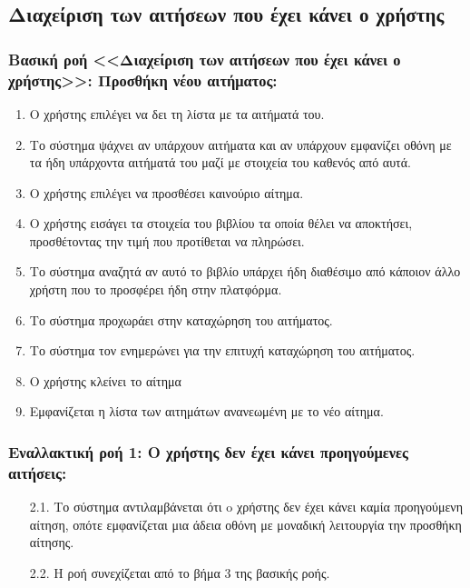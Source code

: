 \documentclass[12pt,a4paper]{article}
\begin{document}
\subsection{Διαχείριση των αιτήσεων που έχει κάνει ο χρήστης}

\subsubsection*{Βασική ροή <<Διαχείριση των αιτήσεων που έχει κάνει ο χρήστης>>: Προσθήκη νέου αιτήματος:}
\begin{enumerate}
    \item Ο χρήστης επιλέγει να δει τη λίστα με τα αιτήματά του. 
    \item Το σύστημα ψάχνει αν υπάρχουν αιτήματα και αν υπάρχουν εμφανίζει οθόνη με τα ήδη υπάρχοντα αιτήματά του μαζί με στοιχεία του καθενός από αυτά. 
    \item Ο χρήστης επιλέγει να προσθέσει καινούριο αίτημα.
    \item Ο χρήστης εισάγει τα στοιχεία του βιβλίου τα οποία θέλει να αποκτήσει, προσθέτοντας την τιμή που προτίθεται να πληρώσει. 
    \item Το σύστημα αναζητά αν αυτό το βιβλίο υπάρχει ήδη διαθέσιμο από κάποιον άλλο χρήστη που το προσφέρει ήδη στην πλατφόρμα. 
    \item Το σύστημα προχωράει στην καταχώρηση του αιτήματος. 
    \item Το σύστημα τον ενημερώνει για την επιτυχή καταχώρηση του αιτήματος. 
    \item Ο χρήστης κλείνει το αίτημα
    \item Εμφανίζεται η λίστα των αιτημάτων ανανεωμένη με το νέο αίτημα.
\end{enumerate}

\subsubsection*{Εναλλακτική ροή 1: Ο χρήστης δεν έχει κάνει προηγούμενες αιτήσεις:}
\begin{enumerate}
    \item[2.1.] Το σύστημα αντιλαμβάνεται ότι o χρήστης δεν έχει κάνει καμία προηγούμενη αίτηση, οπότε εμφανίζεται μια άδεια οθόνη με μοναδική λειτουργία την προσθήκη αίτησης.
    \item[2.2.] Η ροή συνεχίζεται από το βήμα 3 της βασικής ροής.
\end{enumerate}
\end{document}
